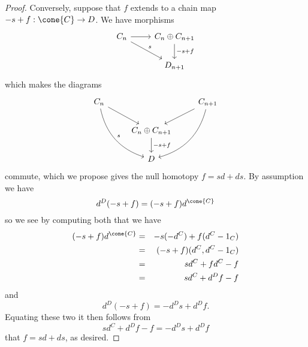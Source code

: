 \documentclass[10pt]{amsart}
\begin{document}
\begin{ex}
\begin{proof}
    Conversely, suppose that $f$ extends to a chain map $-s + f : \cone{C} \rightarrow D$.
    We have morphisms
    $$\begin{tikzcd}
      C_{n} \arrow{r}\arrow{rd}{s} & C_n \oplus C_{n+1}\arrow{d}{-s + f}\\
      & D_{n + 1}
    \end{tikzcd}$$
    which makes the diagrams
    $$\begin{tikzcd}
      C_n \arrow[bend right]{rdd}{s} \arrow{rd} & & C_{n+1}\arrow{ld}\arrow[bend left]{ldd}\\
      & C_n \oplus C_{n+1}\arrow{d}{-s + f} & \\
      & D &
    \end{tikzcd}$$
    commute, which we propose gives the null homotopy $f = sd + ds$.
    By assumption we have
    $$d^D(-s + f) = (-s + f)d^{\cone{C}}$$
    so we see by computing both that we have
    \begin{eqnarray*}
      (-s + f)d^{\cone{C}} &=& -s(-d^C) + f(d^C - 1_C)\\
      &=&(-s + f)(d^C, d^C - 1_C)\\
      &=& sd^C + fd^C - f\\
      &=& sd^C + d^Df - f\\
    \end{eqnarray*}
    and
    $$d^D(-s + f) = -d^Ds + d^Df.$$
    Equating these two it then follows from
    $$sd^C + d^Df - f = -d^Ds + d^Df$$
    that $f = sd + ds$, as desired.
  \end{proof}
\end{ex}
\end{document}
